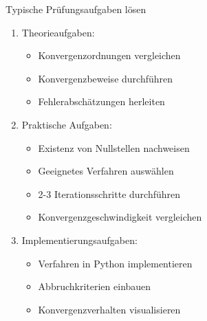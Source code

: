 \begin{KR}{Typische Prüfungsaufgaben lösen}
\begin{enumerate}
    \item Theorieaufgaben:
    \begin{itemize}
        \item Konvergenzordnungen vergleichen
        \item Konvergenzbeweise durchführen
        \item Fehlerabschätzungen herleiten
    \end{itemize}
    
    \item Praktische Aufgaben:
    \begin{itemize}
        \item Existenz von Nullstellen nachweisen
        \item Geeignetes Verfahren auswählen
        \item 2-3 Iterationsschritte durchführen
        \item Konvergenzgeschwindigkeit vergleichen
    \end{itemize}
    
    \item Implementierungsaufgaben:
    \begin{itemize}
        \item Verfahren in Python implementieren
        \item Abbruchkriterien einbauen
        \item Konvergenzverhalten visualisieren
    \end{itemize}
\end{enumerate}
\end{KR}

